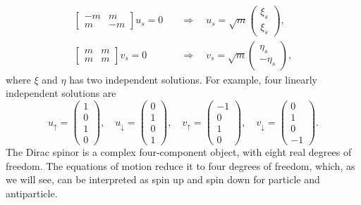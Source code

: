 \begin{equation}
\begin{aligned}
	\begin{bmatrix}
		-m & m \\
		m & -m
	\end{bmatrix} u_s = 0 
	\quad &\Longrightarrow \quad
	u_s = \sqrt{m}\begin{pmatrix}
		\xi_s \\ \xi_s
	\end{pmatrix}, \\
	\begin{bmatrix}
		m & m \\
		m & m
	\end{bmatrix} v_s = 0 
	\quad &\Longrightarrow \quad
	v_s = \sqrt{m}\begin{pmatrix}
		\eta_s \\ -\eta_s
	\end{pmatrix},
\end{aligned}
\end{equation}
where $\xi$ and $\eta$ has two independent solutions.
For example, four linearly independent solutions are
\begin{equation}
	u_{\uparrow} = \begin{pmatrix} 1 \\ 0 \\ 1 \\ 0 \end{pmatrix}, \quad
	u_{\downarrow} = \begin{pmatrix} 0 \\ 1 \\ 0 \\ 1 \end{pmatrix}, \quad
	v_{\uparrow} = \begin{pmatrix} -1 \\ 0 \\ 1 \\ 0 \end{pmatrix}, \quad
	v_{\downarrow} = \begin{pmatrix} 0 \\ 1 \\ 0 \\ -1 \end{pmatrix}.
\end{equation}
The Dirac spinor is a complex four-component object, with eight real degrees of freedom. 
The equations of motion reduce it to four degrees of freedom, which, as we will see, can be interpreted as spin up and spin down for particle and antiparticle.


